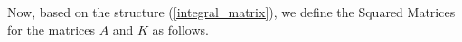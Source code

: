 \documentclass{article}
\newtheorem{definition}{Definition}
\begin{document}
Now, based on the structure (\ref{integral_matrix}), we define the Squared Matrices for the matrices $A$ and $K$ as follows.  






\end{document}
